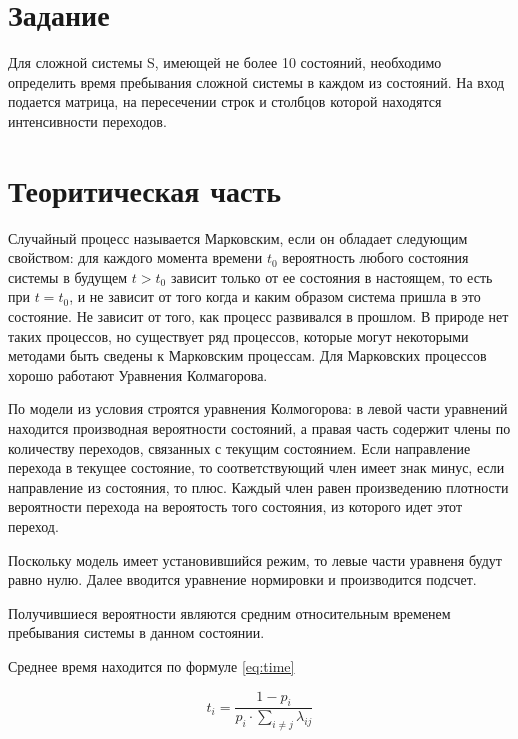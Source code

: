 \documentclass[a4paper, 12pt]{article}
\begin{document}
\section{{Задание}}

\hspace*{5mm} Для сложной системы S, имеющей не более 10 состояний, необходимо определить время пребывания сложной системы в каждом из состояний. На вход подается матрица, на пересечении строк и столбцов которой находятся интенсивности переходов.

\section{{Теоритическая часть}}
Случайный процесс называется Марковским, если он обладает следующим свойством: для каждого момента времени $t_0$ вероятность любого состояния системы в будущем $t > t_0$ зависит только от ее состояния в настоящем, то есть при $t = t_0$, и не зависит от того когда и каким образом система пришла в это состояние. Не зависит от того, как процесс развивался в прошлом. В природе нет таких процессов, но существует ряд процессов, которые могут некоторыми методами быть сведены к Марковским процессам. Для Марковских процессов хорошо работают Уравнения Колмагорова.

По модели из условия строятся уравнения Колмогорова: в левой части уравнений находится производная вероятности состояний, а правая часть содержит члены по количеству переходов, связанных с текущим состоянием. Если направление перехода в текущее состояние, то соответствующий член имеет знак минус, если направление из состояния, то плюс. Каждый член равен произведению плотности вероятности перехода на вероятость того состояния, из которого идет этот переход.

Поскольку модель имеет установившийся режим, то левые части уравненя будут равно нулю. Далее вводится уравнение нормировки и производится подсчет.

Получившиеся вероятности являются средним относительным временем пребывания системы в данном состоянии.

Среднее время находится по формуле \ref{eq:time}

\begin{equation}\label{eq:time}
	t_i = \frac{1 - p_i}{p_i \cdot \sum_{i \ne j}\lambda_{ij}}
\end{equation}
\end{document}
